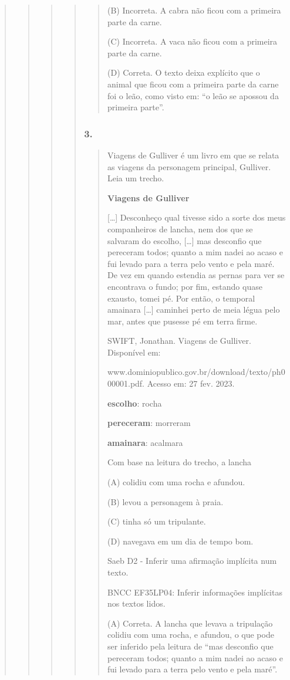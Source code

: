 \begin{quote}
\begin{quote}
\begin{quote}
\begin{quote}
\begin{quote}
(B) Incorreta. A cabra não ficou com a primeira parte da carne.

(C) Incorreta. A vaca não ficou com a primeira parte da carne.

(D) Correta. O texto deixa explícito que o animal que ficou com a
primeira parte da carne foi o leão, como visto em: ``o leão se apossou
da primeira parte''.
\end{quote}

\subsubsection{3. }\label{section-82}

\begin{quote}
Viagens de Gulliver é um livro em que se relata as viagens da personagem
principal, Gulliver. Leia um trecho.

\textbf{Viagens de Gulliver}

{[}\ldots{}{]} Desconheço qual tivesse sido a sorte dos meus
companheiros de lancha, nem dos que se salvaram do escolho,
{[}\ldots{}{]} mas desconfio que pereceram todos; quanto a mim nadei ao
acaso e fui levado para a terra pelo vento e pela maré. De vez em quando
estendia as pernas para ver se encontrava o fundo; por fim, estando
quase exausto, tomei pé. Por então, o temporal amainara {[}\ldots{}{]}
caminhei perto de meia légua pelo mar, antes que pusesse pé em terra
firme.

SWIFT, Jonathan. Viagens de Gulliver. Disponível em:

www.dominiopublico.gov.br/download/texto/ph000001.pdf. Acesso em: 27
fev. 2023.

\textbf{escolho}: rocha

\textbf{pereceram}: morreram

\textbf{amainara}: acalmara

Com base na leitura do trecho, a lancha

(A) colidiu com uma rocha e afundou.

(B) levou a personagem à praia.

(C) tinha só um tripulante.

(D) navegava em um dia de tempo bom.

Saeb D2 - Inferir uma afirmação implícita num texto.

BNCC EF35LP04: Inferir informações implícitas nos textos lidos.

(A) Correta. A lancha que levava a tripulação colidiu com uma rocha, e
afundou, o que pode ser inferido pela leitura de ``mas desconfio que
pereceram todos; quanto a mim nadei ao acaso e fui levado para a terra
pelo vento e pela maré''.


\end{quote}
\end{quote}
\end{quote}
\end{quote}
\end{quote}
